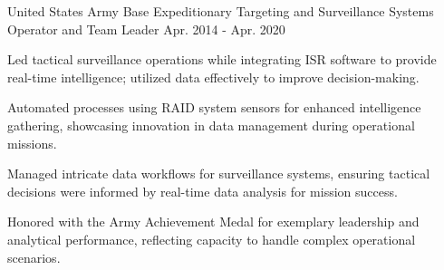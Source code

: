 \begin{cventries}
        \cventry
          {United States Army} %
          {Base Expeditionary Targeting and Surveillance Systems Operator and Team Leader} %
          {} %
          {Apr. 2014 - Apr. 2020} %
          {
            \begin{cvitems} %
            \item {Led tactical surveillance operations while integrating ISR software to provide real-time intelligence; utilized data effectively to improve decision-making.}
    \item {Automated processes using RAID system sensors for enhanced intelligence gathering, showcasing innovation in data management during operational missions.}
    \item {Managed intricate data workflows for surveillance systems, ensuring tactical decisions were informed by real-time data analysis for mission success.}
    \item {Honored with the Army Achievement Medal for exemplary leadership and analytical performance, reflecting capacity to handle complex operational scenarios.}
            \end{cvitems}
          }
\end{cventries}
